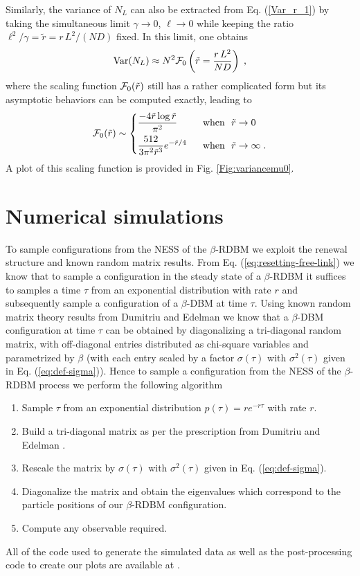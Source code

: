 \documentclass[onecolumn,superscriptaddress,
 amsmath,amssymb,
 aps,
 prd,
]{revtex4-1}
\newcommand{\bea}{\begin{eqnarray}}
\newcommand{\eea}{\end{eqnarray}}
\begin{document}
\vspace*{0.3cm}
Similarly, the variance of $N_L$ can also be extracted from Eq. (\ref{Var_r_1}) by taking the simultaneous limit $\gamma \to 0$, $\ell \to 0$ while keeping the  ratio $\ell^2/\gamma = \tilde r = r\,L^2/(N D)$ fixed. In this limit, one obtains
\bea \label{var_mu0}
{\rm Var}(N_L) \approx N^2 {\cal F}_0\left(\tilde r = \frac{r\, L^2}{N D}\right) \;,
\eea
where the scaling function ${\cal F}_0(\tilde r)$ still has a rather complicated form but its asymptotic behaviors can be computed exactly, leading to 
\begin{equation}
\mathcal{F}_0(\tilde r) \sim \begin{dcases}
 \frac{-4 \tilde r \log \tilde r}{\pi^2} &\mbox{~~when~~} \tilde r \to 0 \\
\frac{512}{3 \pi^2 \tilde r^3} e^{-\tilde r/4} &\mbox{~~when~~} \tilde r \to \infty \;.
\end{dcases}
\end{equation}
A plot of this scaling function is provided in Fig. \ref{Fig:variancemu0}.


\section{Numerical simulations}

To sample configurations from the NESS of the $\beta$-RDBM we exploit the renewal structure and known random matrix results. From Eq. (\ref{eq:resetting-free-link}) we know that to sample a configuration in the steady state of a $\beta$-RDBM it suffices to samples a time $\tau$ from an exponential distribution with rate $r$ and subsequently sample a configuration of a $\beta$-DBM at time $\tau$. Using known random matrix theory results from Dumitriu and Edelman \cite{DE02} we know that a $\beta$-DBM configuration at time $\tau$ can be obtained by diagonalizing a tri-diagonal random matrix, with off-diagonal entries distributed as chi-square variables and parametrized by $\beta$ (with each entry scaled by a factor $\sigma(\tau)$ with $\sigma^2(\tau)$ given in Eq. (\ref{eq:def-sigma})). Hence to sample a configuration from the NESS of the $\beta$-RDBM process we perform the following algorithm
\begin{enumerate}
    \item Sample $\tau$ from an exponential distribution $p(\tau) = r e^{-r \tau}$ with rate $r$. 
    \item Build a tri-diagonal matrix as per the prescription from Dumitriu and Edelman \cite{DE02}.
    \item Rescale the matrix by $\sigma(\tau)$ with $\sigma^2(\tau)$ given in Eq. (\ref{eq:def-sigma}).
    \item Diagonalize the matrix and obtain the eigenvalues which correspond to the particle positions of our $\beta$-RDBM configuration.
    \item Compute any observable required.
\end{enumerate}
All of the code used to generate the simulated data as well as the post-processing code to create our plots are available at \cite{github}.
\end{document}
